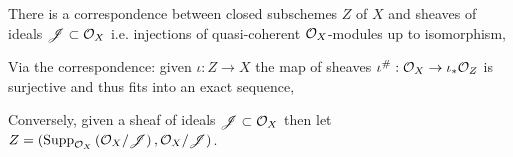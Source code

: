 \documentclass[12pt]{article}
\begin{document}
\begin{theorem}
There is a correspondence between closed subschemes $Z$ of $X$ and sheaves of ideals $\mathscr{J} \subset \mathcal{O}_{X}$ i.e. injections of quasi-coherent $\mathcal{O}_{X}$-modules up to isomorphism,
\begin{center}
\end{center}
Via the correspondence: given $\iota : Z \to X$ the map of sheaves $\iota^\# : \mathcal{O}_{X} \to \iota_* \mathcal{O}_{Z}$ is surjective and thus fits into an exact sequence,
\begin{center}
\end{center}
Conversely, given a sheaf of ideals $\mathscr{J} \subset \mathcal{O}_{X}$ then let $Z = (\mathrm{Supp}_{\mathcal{O}_{X}}\left(\mathcal{O}_{X} / \mathscr{J} \right), \mathcal{O}_{X} / \mathscr{J})$.
\end{theorem}
\end{document}

